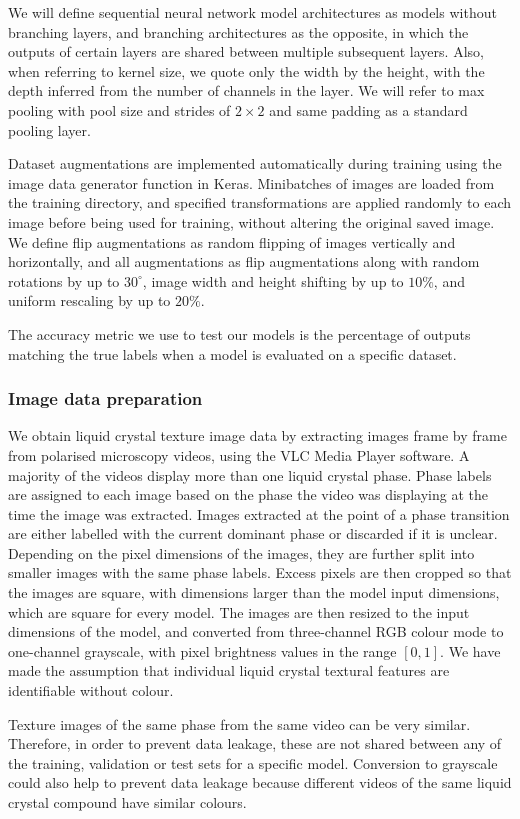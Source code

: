 \documentclass[12pt]{article}
\begin{document}
We will define sequential neural network model architectures as models without branching layers, and branching architectures as the opposite, in which the outputs of certain layers are shared between multiple subsequent layers. Also, when referring to kernel size, we quote only the width by the height, with the depth inferred from the number of channels in the layer. We will refer to max pooling with pool size and strides of $2 \times 2$ and same padding as a standard pooling layer.

Dataset augmentations are implemented automatically during training using the image data generator function in Keras. Minibatches of images are loaded from the training directory, and specified transformations are applied randomly to each image before being used for training, without altering the original saved image. We define flip augmentations as random flipping of images vertically and horizontally, and all augmentations as flip augmentations along with random rotations by up to $30^\circ$, image width and height shifting by up to $10\%$, and uniform rescaling by up to $20\%$.

The accuracy metric we use to test our models is the percentage of outputs matching the true labels when a model is evaluated on a specific dataset.
\subsubsection{Image data preparation}
We obtain liquid crystal texture image data by extracting images frame by frame from polarised microscopy videos, using the VLC Media Player software. A majority of the videos display more than one liquid crystal phase. Phase labels are assigned to each image based on the phase the video was displaying at the time the image was extracted. Images extracted at the point of a phase transition are either labelled with the current dominant phase or discarded if it is unclear. Depending on the pixel dimensions of the images, they are further split into smaller images with the same phase labels. Excess pixels are then cropped so that the images are square, with dimensions larger than the model input dimensions, which are square for every model. The images are then resized to the input dimensions of the model, and converted from three-channel RGB colour mode to one-channel grayscale, with pixel brightness values in the range $[0,1]$. We have made the assumption that individual liquid crystal textural features are identifiable without colour.

Texture images of the same phase from the same video can be very similar. Therefore, in order to prevent data leakage, these are not shared between any of the training, validation or test sets for a specific model. Conversion to grayscale could also help to prevent data leakage because different videos of the same liquid crystal compound have similar colours.
\end{document}
